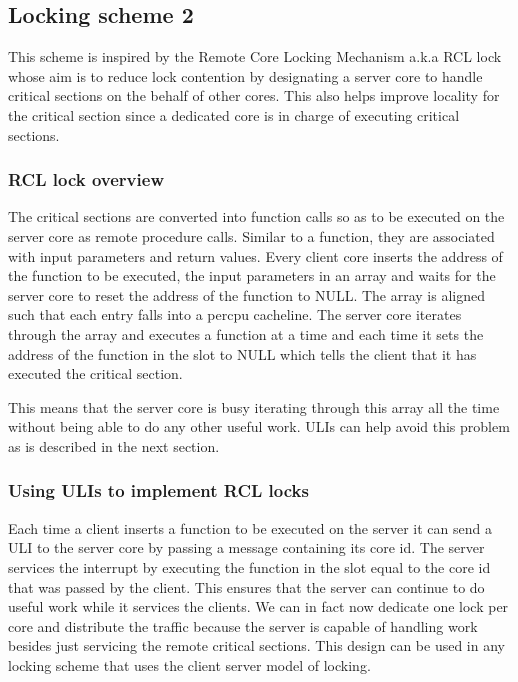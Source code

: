 \subsection{Locking scheme 2}

This scheme is inspired by the Remote Core Locking Mechanism a.k.a RCL lock
whose aim is to reduce lock contention by designating a server core to handle
critical sections on the behalf of other cores. This also helps improve locality
for the critical section since a dedicated core is in charge of executing
critical sections. 

\subsubsection{RCL lock overview}

The critical sections are converted into function calls so as to be executed on
the server core as remote procedure calls. Similar to a function, they are
associated with input parameters and return values. Every client core inserts
the address of the function to be executed, the input parameters in an array and
waits for the server core to reset the address of the function to NULL. The
array is aligned such that each entry falls into a percpu cacheline. The server
core iterates through the array and executes a function at a time and each time
it sets the address of the function in the slot to NULL which tells the client
that it has executed the critical section.

This means that the server core is busy iterating through this array all the
time without being able to do any other useful work. ULIs can help avoid this
problem as is described in the next section.

\subsubsection{Using ULIs to implement RCL locks}

Each time a client inserts a function to be executed on the server it can send a
ULI to the server core by passing a message containing its core id. The server
services the interrupt by executing the function in the slot equal to the core
id that was passed by the client. This ensures that the server can continue to
do useful work while it services the clients. We can in fact now dedicate one
lock per core and distribute the traffic because the server is capable of
handling work besides just servicing the remote critical sections. This design
can be used in any locking scheme that uses the client server model of locking.
